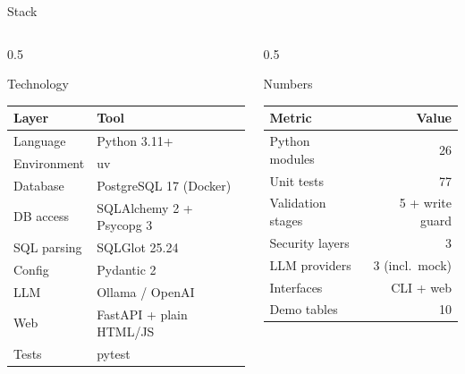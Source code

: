 \documentclass[aspectratio=169,10pt]{beamer}
\begin{document}
\begin{frame}{Stack}
  \begin{columns}[T]
    \begin{column}{0.5\textwidth}
      \begin{block}{Technology}
        \footnotesize
        \begin{tabular}{@{}ll@{}}
          \toprule
          \textbf{Layer} & \textbf{Tool} \\
          \midrule
          Language     & Python 3.11+ \\
          Environment  & uv \\
          Database     & PostgreSQL 17 (Docker) \\
          DB access    & SQLAlchemy 2 + Psycopg 3 \\
          SQL parsing  & SQLGlot 25.24 \\
          Config       & Pydantic 2 \\
          LLM          & Ollama / OpenAI \\
          Web          & FastAPI + plain HTML/JS \\
          Tests        & pytest \\
          \bottomrule
        \end{tabular}
      \end{block}
    \end{column}
    \begin{column}{0.5\textwidth}
      \begin{block}{Numbers}
        \footnotesize
        \begin{tabular}{@{}lr@{}}
          \toprule
          \textbf{Metric} & \textbf{Value} \\
          \midrule
          Python modules       & 26 \\
          Unit tests           & 77 \\
          Validation stages    & 5 + write guard \\
          Security layers      & 3 \\
          LLM providers        & 3 (incl.\ mock) \\
          Interfaces           & CLI + web \\
          Demo tables          & 10 \\
          \bottomrule
        \end{tabular}
      \end{block}
    \end{column}
  \end{columns}
\end{frame}
\end{document}
